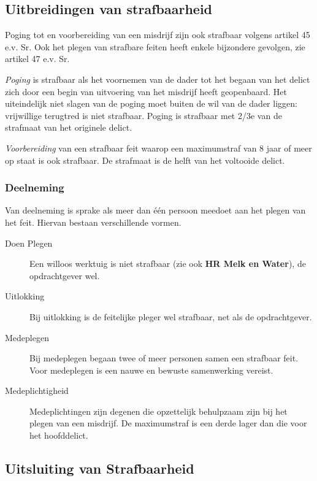 \documentclass{article}
\begin{document}
\subsection{Uitbreidingen van strafbaarheid}

Poging tot en voorbereiding van een misdrijf zijn ook strafbaar volgens artikel
45 e.v. Sr. Ook het plegen van strafbare feiten heeft enkele bijzondere gevolgen,
zie artikel 47 e.v. Sr.

\emph{Poging} is strafbaar als het voornemen van de dader tot het begaan van
het delict zich door een begin van uitvoering van het misdrijf heeft
geopenbaard. Het uiteindelijk niet slagen van de poging moet buiten de wil van
de dader liggen: vrijwillige terugtred is niet strafbaar. Poging is strafbaar
met 2/3e van de strafmaat van het originele delict.

\emph{Voorbereiding} van een strafbaar feit waarop een maximumstraf van 8 jaar
of meer op staat is ook strafbaar. De strafmaat is de helft van het voltooide
delict.

\subsubsection{Deelneming}

Van deelneming is sprake als meer dan \'e\'en persoon meedoet aan het plegen
van het feit. Hiervan bestaan verschillende vormen.

\begin{description}

  \item[Doen Plegen] Een willoos werktuig is niet strafbaar (zie ook \textbf{HR
    Melk en Water}), de opdrachtgever wel.

  \item[Uitlokking] Bij uitlokking is de feitelijke pleger wel strafbaar, net
    als de opdrachtgever.

  \item[Medeplegen] Bij medeplegen begaan twee of meer personen samen een
    strafbaar feit. Voor medeplegen is een nauwe en bewuste samenwerking
    vereist.

  \item[Medeplichtigheid] Medeplichtingen zijn degenen die opzettelijk
    behulpzaam zijn bij het plegen van een misdrijf. De maximumstraf is een
    derde lager dan die voor het hoofddelict.

\end{description}

\subsection{Uitsluiting van Strafbaarheid}
\end{document}
